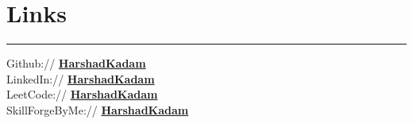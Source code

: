 \documentclass[]{deedy-resume-reversed}
\newcommand{\mysection}[2]{%
    \section{#1\hspace{0.5em}#2}
}
\begin{document}
\begin{minipage}[t]{0.33\textwidth}

\mysection{\faLink}{Links}
\rule{\textwidth}{0.4pt}
Github:// \href{https://github.com/harshad-kadam/integration_contracts_converter_v1/blob/main/apiproxy/policies/EXT-OpenAIConnect.xml}{\bf HarshadKadam} \\
LinkedIn://  \href{https://www.linkedin.com/in/harshad-kadam/}{\bf HarshadKadam} \\
LeetCode:// \href{https://leetcode.com/Harshad_K/}{\bf HarshadKadam} \\
SkillForgeByMe://  \href{https://t.me/apigeedeveloper}{\bf HarshadKadam} 
\sectionsep

\end{minipage}
\end{document}
